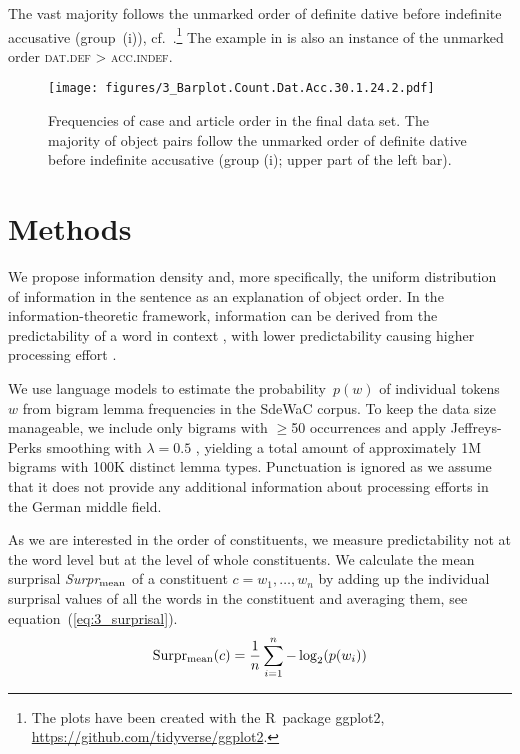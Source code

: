 \documentclass[output=paper,colorlinks,citecolor=brown]{langscibook}
\begin{document}
The vast majority follows the unmarked order of definite dative before indefinite accusative (group~(i)), cf.\ .\footnote{The plots have been created with the R~package ggplot2, \url{https://github.com/tidyverse/ggplot2}.} The example in  is also an instance of the unmarked order \textsc{dat.def} > \textsc{acc.indef}.

\begin{figure}
  \texttt{[image: figures/3\_Barplot.Count.Dat.Acc.30.1.24.2.pdf]}
  \caption{Frequencies of case and article order in the final data set. The majority of object pairs follow the unmarked order of definite dative before indefinite accusative (group (i); upper part of the left bar).}
  \label{fig:obj_order}
\end{figure}

\section{Methods}\label{sec:method}
We propose information density and, more specifically, the uniform distribution of information in the sentence as an explanation of object order. In the information-theoretic framework, information can be derived from the predictability of a word in context \citep{shannon-1948}, with lower predictability causing higher processing effort \citep{Hale.2001, Levy.2008}. 

We use language models to estimate the probability~$p(w)$ of individual tokens~$w$ from bigram lemma frequencies in the SdeWaC corpus. To keep the data size manageable, we include only bigrams with $\geq$50 occurrences and apply Jeffreys-Perks smoothing with $\lambda = 0.5$ \citep{jeffreys46}, yielding a total amount of approximately 1M bigrams with 100K distinct lemma types. Punctuation is ignored as we assume that it does not provide any additional information about processing efforts in the German middle field. 

As we are interested in the order of constituents, we measure predictability not at the word level but at the level of whole constituents. We calculate the mean surprisal \emph{Surpr}$\textsubscript{mean}$ of a constituent $c = w_1, \dots, w_n$ by adding up the individual surprisal values of all the words in the constituent and averaging them, see equation~(\ref{eq:3_surprisal}).
\begin{equation}
\textnormal{Surpr\textsubscript{mean}}(c) = \frac{1}{n} \sum_{i=1}^n -\log_2(p(w_i)) \label{eq:3_surprisal}
\end{equation}
\end{document}

